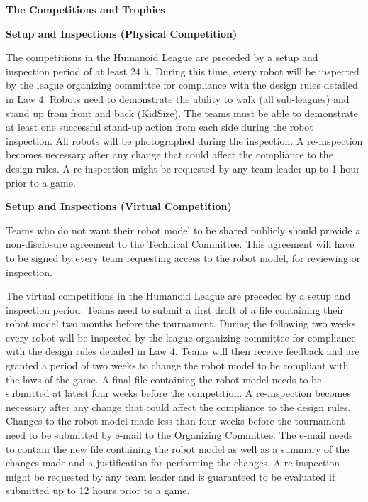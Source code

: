 \clearpage
\sffamily
{\bfseries\color[rgb]{0.4,0.4,0.4}The Competitions and Trophies}
{}


\bigskip

{\bfseries Setup and Inspections (Physical Competition)}

\headlinebox

The competitions in the Humanoid League are preceded by a setup and inspection
period of at least 24 h.
During this time, every robot will be inspected by the league organizing
committee for compliance with the design rules detailed in Law 4.
Robots need to demonstrate the ability to walk (all sub-leagues) and stand up
from front and back (KidSize).
The teams must be able to demonstrate at least one successful stand-up action
from each side during the robot inspection.
All robots will be photographed during the inspection.
A re-inspection becomes necessary after any change that could affect the
compliance to the design rules.
A re-inspection might be requested by any team leader up to 1 hour prior to a game.

\bigskip

{\bfseries Setup and Inspections (Virtual Competition)}

\headlinebox

Teams who do not want their robot model to be shared publicly should
provide a non-disclosure agreement to the Technical Committee. This agreement
will have to be signed by every team requesting access to the robot model, for
reviewing or inspection.

The virtual competitions in the Humanoid League are preceded by a setup and inspection
period. Teams need to submit a first draft of a file containing their robot model two months before the tournament.
During the following two weeks, every robot will be inspected by the league organizing
committee for compliance with the design rules detailed in Law 4. Teams will then receive feedback and are granted a period of two weeks to change the robot model to be compliant with the laws of the game. A final file containing the robot model needs to be submitted at latest four weeks before the competition.
A re-inspection becomes necessary after any change that could affect the
compliance to the design rules. Changes to the robot model made less than four weeks before the tournament need to be submitted by e-mail to the Organizing Committee. The e-mail needs to contain the new file containing the robot model as well as a summary of the changes made and a justification for performing the changes.
A re-inspection might be requested by any team leader and is guaranteed to be evaluated if submitted up to 12 hours prior to a game.


